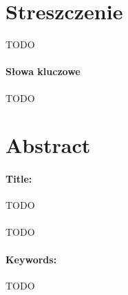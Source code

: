 \newpage
\thispagestyle{empty} %
\section*{Streszczenie}
TODO
\paragraph{Słowa kluczowe} TODO

\section*{Abstract}
\paragraph{Title:} TODO\\\\
TODO
\paragraph{Keywords:} TODO